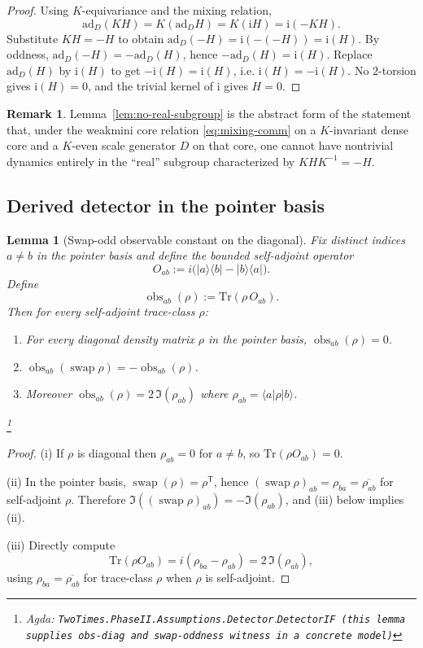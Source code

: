 \documentclass{article}
\newcommand{\swap}{\operatorname{swap}}
\newcommand{\obs}{\operatorname{obs}}
\newcommand{\Agda}[1]{\texttt{#1}}
\newcommand{\AgdaRef}[2]{\emph{Agda: }\Agda{#1}.\Agda{#2}}
\newcommand{\AgdaNote}[2]{\footnote{\AgdaRef{#1}{#2}}}
\theoremstyle{definition}
\newtheorem{remark}{Remark}[section]
\theoremstyle{plain}
\newtheorem{lemma}{Lemma}[section]
\begin{document}
\begin{proof}
Using $K$-equivariance and the mixing relation,
\[\mathrm{ad}_D(KH)=K(\mathrm{ad}_D H)=K(\mathrm{i}H)=\mathrm{i}(-KH).\]
Substitute $KH=-H$ to obtain $\mathrm{ad}_D(-H)=\mathrm{i}(-(-H))=\mathrm{i}(H)$.
By oddness, $\mathrm{ad}_D(-H)=-\mathrm{ad}_D(H)$, hence
$-\mathrm{ad}_D(H)=\mathrm{i}(H)$. Replace $\mathrm{ad}_D(H)$ by $\mathrm{i}(H)$ to get
$-\mathrm{i}(H)=\mathrm{i}(H)$, i.e. $\mathrm{i}(H)=-\mathrm{i}(H)$.
No $2$-torsion gives $\mathrm{i}(H)=0$, and the trivial kernel of $\mathrm{i}$ gives $H=0$.
\end{proof}

\begin{remark}
Lemma~\ref{lem:no-real-subgroup} is the abstract form of the statement that, under
the weakmini core relation \eqref{eq:mixing-comm} on a $K$-invariant dense core and
a $K$-even scale generator $D$ on that core, one cannot have nontrivial dynamics
entirely in the ``real'' subgroup characterized by $KHK^{-1}=-H$.
\end{remark}

\subsection{Derived detector in the pointer basis}

\begin{lemma}[Swap-odd observable constant on the diagonal]
\label{lem:swap-odd-observable}
Fix distinct indices $a\ne b$ in the pointer basis and define the bounded self-adjoint
operator
\[O_{ab}:= i\big(\lvert a\rangle\langle b\rvert-\lvert b\rangle\langle a\rvert\big).\]
Define
\[\obs_{ab}(\rho):=\mathrm{Tr}(\rho\,O_{ab}).\]
Then for every \emph{self-adjoint} trace-class $\rho$:
\begin{enumerate}[label=\textbf{(\roman*)},leftmargin=*,itemsep=0.4em]
\item For every diagonal density matrix $\rho$ in the pointer basis,
$\obs_{ab}(\rho)=0$.
\item $\obs_{ab}(\swap\rho)=-\obs_{ab}(\rho)$.
\item Moreover $\obs_{ab}(\rho)=2\,\Im(\rho_{ab})$ where $\rho_{ab}=\langle a\rvert\rho\lvert b\rangle$.
\end{enumerate}
\AgdaNote{TwoTimes.PhaseII.Assumptions.Detector}{DetectorIF (this lemma supplies obs-diag and swap-oddness witness in a concrete model)}
\end{lemma}

\begin{proof}
(i) If $\rho$ is diagonal then $\rho_{ab}=0$ for $a\ne b$, so $\mathrm{Tr}(\rho O_{ab})=0$.

(ii) In the pointer basis, $\swap(\rho)=\rho^{\mathsf T}$, hence
$(\swap\rho)_{ab}=\rho_{ba}=\overline{\rho_{ab}}$ for self-adjoint $\rho$.
Therefore $\Im((\swap\rho)_{ab})=-\Im(\rho_{ab})$, and (iii) below implies (ii).

(iii) Directly compute
\[\mathrm{Tr}(\rho O_{ab})= i(\rho_{ba}-\rho_{ab})=2\,\Im(\rho_{ab}),\]
using $\rho_{ba}=\overline{\rho_{ab}}$ for trace-class $\rho$ when $\rho$ is self-adjoint.
\end{proof}
\end{document}

